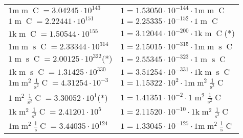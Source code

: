\begin{center}
\begin{longtable}{l l}
{\color{gray}$1 \bm{\mathrm{ m}}{\operatorname{m}}{}{\operatorname{C}}{} = 3.04245\cdot10^{143} $}   & {\color{gray}$ 1 = 1.53050\cdot10^{-144} \cdot 1 \bm{\mathrm{ m}}{\operatorname{m}}{}{\operatorname{C}}{}$}  \\
{\color{black}$1 \bm{\mathrm{ }}{\operatorname{m}}{}{\operatorname{C}}{} = 2.22441\cdot10^{151} $}   & {\color{black}$ 1 = 2.25335\cdot10^{-152} \cdot 1 \bm{\mathrm{ }}{\operatorname{m}}{}{\operatorname{C}}{}$}  \\
{\color{gray}$1 \bm{\mathrm{ k}}{\operatorname{m}}{}{\operatorname{C}}{} = 1.50544\cdot10^{155} $}   & {\color{gray}$ 1 = 3.12044\cdot10^{-200} \cdot 1 \bm{\mathrm{ k}}{\operatorname{m}}{}{\operatorname{C}}{}$}\quad(*)\\
{\color{gray}$1 \bm{\mathrm{ m}}{\operatorname{m}}{\operatorname{s}}{\operatorname{C}}{} = 2.33344\cdot10^{314} $}   & {\color{gray}$ 1 = 2.15015\cdot10^{-315} \cdot 1 \bm{\mathrm{ m}}{\operatorname{m}}{\operatorname{s}}{\operatorname{C}}{}$}  \\
{\color{black}$1 \bm{\mathrm{ }}{\operatorname{m}}{\operatorname{s}}{\operatorname{C}}{} = 2.00125\cdot10^{322} $}\quad(*) & {\color{black}$ 1 = 2.55345\cdot10^{-323} \cdot 1 \bm{\mathrm{ }}{\operatorname{m}}{\operatorname{s}}{\operatorname{C}}{}$}  \\
{\color{gray}$1 \bm{\mathrm{ k}}{\operatorname{m}}{\operatorname{s}}{\operatorname{C}}{} = 1.31425\cdot10^{330} $}   & {\color{gray}$ 1 = 3.51254\cdot10^{-331} \cdot 1 \bm{\mathrm{ k}}{\operatorname{m}}{\operatorname{s}}{\operatorname{C}}{}$}  \\
{\color{gray}$1 \bm{\mathrm{ m}}{\operatorname{m}^2}\frac1{\operatorname{s}^2}{\operatorname{C}}{} = 4.31254\cdot10^{-3} $}   & {\color{gray}$ 1 = 1.15322\cdot10^{2} \cdot 1 \bm{\mathrm{ m}}{\operatorname{m}^2}\frac1{\operatorname{s}^2}{\operatorname{C}}{}$}  \\
{\color{black}$1 \bm{\mathrm{ }}{\operatorname{m}^2}\frac1{\operatorname{s}^2}{\operatorname{C}}{} = 3.30052\cdot10^{1} $}\quad(*) & {\color{black}$ 1 = 1.41351\cdot10^{-2} \cdot 1 \bm{\mathrm{ }}{\operatorname{m}^2}\frac1{\operatorname{s}^2}{\operatorname{C}}{}$}  \\
{\color{gray}$1 \bm{\mathrm{ k}}{\operatorname{m}^2}\frac1{\operatorname{s}^2}{\operatorname{C}}{} = 2.41201\cdot10^{5} $}   & {\color{gray}$ 1 = 2.11520\cdot10^{-10} \cdot 1 \bm{\mathrm{ k}}{\operatorname{m}^2}\frac1{\operatorname{s}^2}{\operatorname{C}}{}$}  \\
{\color{gray}$1 \bm{\mathrm{ m}}{\operatorname{m}^2}\frac1{\operatorname{s}}{\operatorname{C}}{} = 3.44035\cdot10^{124} $}   & {\color{gray}$ 1 = 1.33045\cdot10^{-125} \cdot 1 \bm{\mathrm{ m}}{\operatorname{m}^2}\frac1{\operatorname{s}}{\operatorname{C}}{}$}  \\

\end{longtable}
\end{center}
